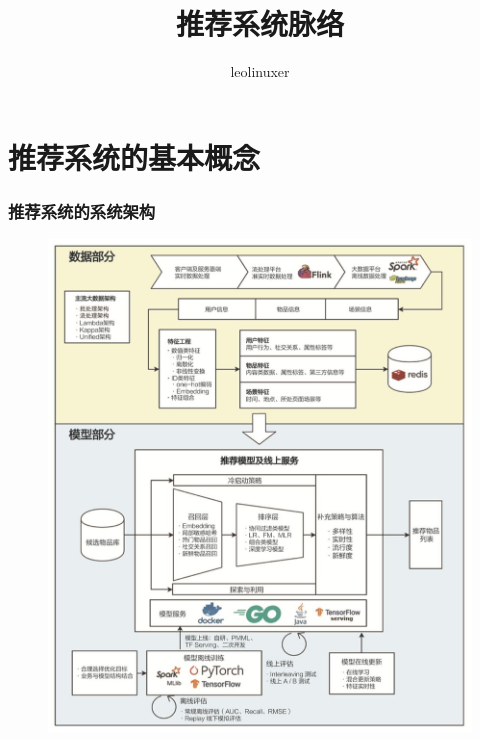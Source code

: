 \documentclass[12pt]{article}
\title{推荐系统脉络\cite{Deep_Learning_Recommender_System}\cite{Recommender_System_With_Deep_Learning_Collection}}
\author{leolinuxer}
\begin{document}
\maketitle
\tableofcontents

\part{推荐系统的基本概念}
\section{推荐系统的系统架构}
\begin{figure}[H]
    \centering
    \includegraphics[width=1\textwidth]{fig/Deep_Learning_Refenrence_System_Architecture.jpg}
\end{figure}
\end{document}
